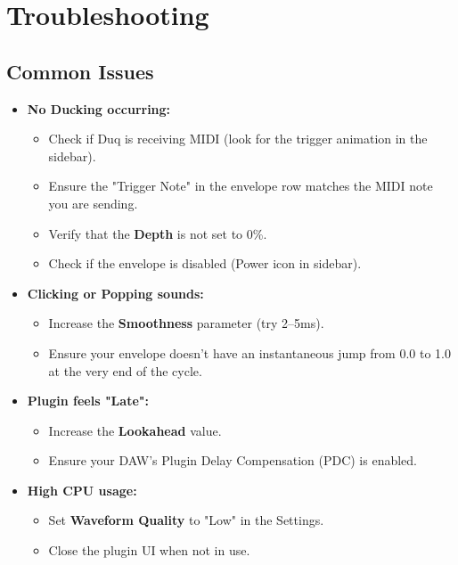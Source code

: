 \chapter{Troubleshooting}
\label{ch:troubleshooting}

\section{Common Issues}
\begin{itemize}
    \item \textbf{No Ducking occurring:}
      \begin{itemize}
          \item Check if Duq is receiving MIDI (look for the trigger animation in the sidebar).
          \item Ensure the "Trigger Note" in the envelope row matches the MIDI note you are sending.
          \item Verify that the \textbf{Depth} is not set to 0\%.
          \item Check if the envelope is disabled (Power icon in sidebar).
      \end{itemize}
    \item \textbf{Clicking or Popping sounds:}
      \begin{itemize}
          \item Increase the \textbf{Smoothness} parameter (try 2--5ms).
          \item Ensure your envelope doesn't have an instantaneous jump from 0.0 to 1.0 at the very end of the cycle.
      \end{itemize}
    \item \textbf{Plugin feels "Late":}
      \begin{itemize}
          \item Increase the \textbf{Lookahead} value.
          \item Ensure your DAW's Plugin Delay Compensation (PDC) is enabled.
      \end{itemize}
    \item \textbf{High CPU usage:}
      \begin{itemize}
          \item Set \textbf{Waveform Quality} to "Low" in the Settings.
          \item Close the plugin UI when not in use.
      \end{itemize}
\end{itemize}
